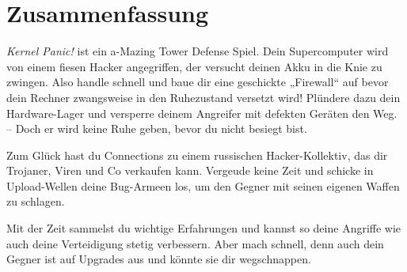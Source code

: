 \section{Zusammenfassung}


\textit{Kernel Panic!} ist ein a-Mazing Tower Defense Spiel.
Dein Supercomputer wird von einem fiesen Hacker angegriffen, der versucht deinen Akku in die Knie zu zwingen.
Also handle schnell und baue dir eine geschickte „Firewall“ auf bevor dein Rechner zwangsweise in den Ruhezustand versetzt wird! Plündere dazu dein Hardware-Lager und versperre deinem Angreifer mit defekten Geräten den Weg. -- Doch er wird keine Ruhe geben, bevor du nicht besiegt bist.

Zum Glück hast du Connections zu einem russischen Hacker-Kollektiv, das dir Trojaner, Viren und Co verkaufen kann. Vergeude keine Zeit und schicke in Upload-Wellen deine Bug-Armeen los, um den Gegner mit seinen eigenen Waffen zu schlagen.

Mit der Zeit sammelst du wichtige Erfahrungen und kannst so deine Angriffe wie auch deine Verteidigung stetig verbessern. Aber mach schnell, denn auch dein Gegner ist auf Upgrades aus und könnte sie dir wegschnappen.
